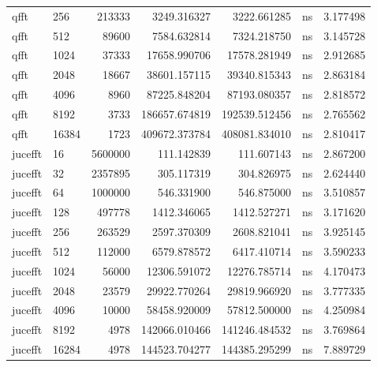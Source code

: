 \begin{tabular}{llrrrlr}
qfft & 256 & 213333 & 3249.316327 & 3222.661285 & ns & 3.177498 \\
qfft & 512 & 89600 & 7584.632814 & 7324.218750 & ns & 3.145728 \\
qfft & 1024 & 37333 & 17658.990706 & 17578.281949 & ns & 2.912685 \\
qfft & 2048 & 18667 & 38601.157115 & 39340.815343 & ns & 2.863184 \\
qfft & 4096 & 8960 & 87225.848204 & 87193.080357 & ns & 2.818572 \\
qfft & 8192 & 3733 & 186657.674819 & 192539.512456 & ns & 2.765562 \\
qfft & 16384 & 1723 & 409672.373784 & 408081.834010 & ns & 2.810417 \\
jucefft & 16 & 5600000 & 111.142839 & 111.607143 & ns & 2.867200 \\
jucefft & 32 & 2357895 & 305.117319 & 304.826975 & ns & 2.624440 \\
jucefft & 64 & 1000000 & 546.331900 & 546.875000 & ns & 3.510857 \\
jucefft & 128 & 497778 & 1412.346065 & 1412.527271 & ns & 3.171620 \\
jucefft & 256 & 263529 & 2597.370309 & 2608.821041 & ns & 3.925145 \\
jucefft & 512 & 112000 & 6579.878572 & 6417.410714 & ns & 3.590233 \\
jucefft & 1024 & 56000 & 12306.591072 & 12276.785714 & ns & 4.170473 \\
jucefft & 2048 & 23579 & 29922.770264 & 29819.966920 & ns & 3.777335 \\
jucefft & 4096 & 10000 & 58458.920009 & 57812.500000 & ns & 4.250984 \\
jucefft & 8192 & 4978 & 142066.010466 & 141246.484532 & ns & 3.769864 \\
jucefft & 16284 & 4978 & 144523.704277 & 144385.295299 & ns & 7.889729 \\
\bottomrule
\end{tabular}
